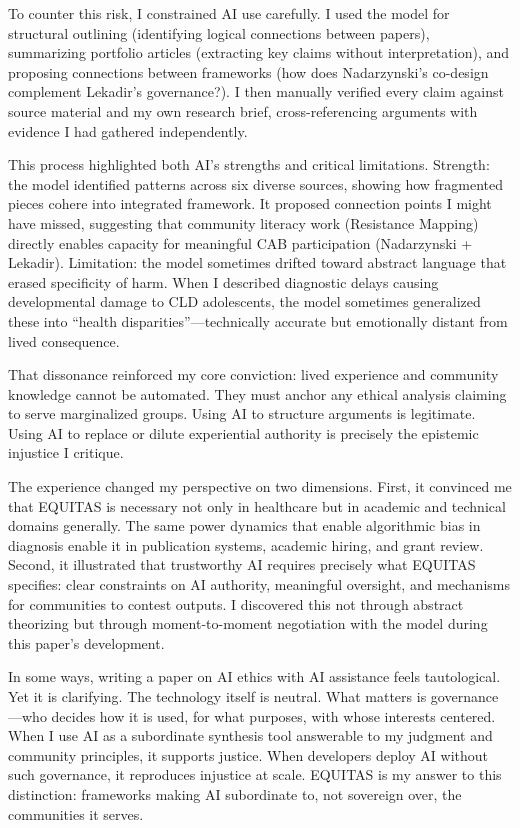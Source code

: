 \documentclass[12pt,a4paper]{article}
\begin{document}
To counter this risk, I constrained AI use carefully. I used the model for structural outlining (identifying logical connections between papers), summarizing portfolio articles (extracting key claims without interpretation), and proposing connections between frameworks (how does Nadarzynski's co-design complement Lekadir's governance?). I then manually verified every claim against source material and my own research brief, cross-referencing arguments with evidence I had gathered independently.

This process highlighted both AI's strengths and critical limitations. Strength: the model identified patterns across six diverse sources, showing how fragmented pieces cohere into integrated framework. It proposed connection points I might have missed, suggesting that community literacy work (Resistance Mapping) directly enables capacity for meaningful CAB participation (Nadarzynski + Lekadir). Limitation: the model sometimes drifted toward abstract language that erased specificity of harm. When I described diagnostic delays causing developmental damage to CLD adolescents, the model sometimes generalized these into ``health disparities''—technically accurate but emotionally distant from lived consequence.

That dissonance reinforced my core conviction: lived experience and community knowledge cannot be automated. They must anchor any ethical analysis claiming to serve marginalized groups. Using AI to structure arguments is legitimate. Using AI to replace or dilute experiential authority is precisely the epistemic injustice I critique.

The experience changed my perspective on two dimensions. First, it convinced me that EQUITAS is necessary not only in healthcare but in academic and technical domains generally. The same power dynamics that enable algorithmic bias in diagnosis enable it in publication systems, academic hiring, and grant review. Second, it illustrated that trustworthy AI requires precisely what EQUITAS specifies: clear constraints on AI authority, meaningful oversight, and mechanisms for communities to contest outputs. I discovered this not through abstract theorizing but through moment-to-moment negotiation with the model during this paper's development.

In some ways, writing a paper on AI ethics with AI assistance feels tautological. Yet it is clarifying. The technology itself is neutral. What matters is governance—who decides how it is used, for what purposes, with whose interests centered. When I use AI as a subordinate synthesis tool answerable to my judgment and community principles, it supports justice. When developers deploy AI without such governance, it reproduces injustice at scale. EQUITAS is my answer to this distinction: frameworks making AI subordinate to, not sovereign over, the communities it serves.
\end{document}
